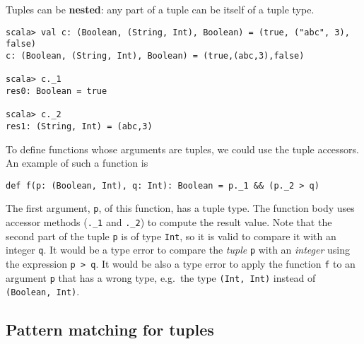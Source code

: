 Tuples can be \textbf{nested}: any part of a
tuple can be itself of a tuple type.
\begin{lstlisting}
scala> val c: (Boolean, (String, Int), Boolean) = (true, ("abc", 3), false)
c: (Boolean, (String, Int), Boolean) = (true,(abc,3),false)

scala> c._1
res0: Boolean = true

scala> c._2
res1: (String, Int) = (abc,3)
\end{lstlisting}
To define functions whose arguments are tuples, we could use the tuple
accessors. An example of such a function is
\begin{lstlisting}
def f(p: (Boolean, Int), q: Int): Boolean = p._1 && (p._2 > q) 
\end{lstlisting}
The first argument, \lstinline!p!,
of this function, has a tuple type. The function body uses accessor
methods (\lstinline!._1!
and \lstinline!._2!) to
compute the result value. Note that the second part of the tuple \lstinline!p!
is of type \lstinline!Int!,
so it is valid to compare it with an integer \lstinline!q!.
It would be a type error to compare the \emph{tuple}
\lstinline!p! with an \emph{integer}
using the expression \lstinline!p > q!.
It would be also a type error to apply the function \lstinline!f!
to an argument \lstinline!p!
that has a wrong type, e.g.~the type \lstinline!(Int, Int)!
instead of \lstinline!(Boolean, Int)!.

\subsection{Pattern matching for tuples}

